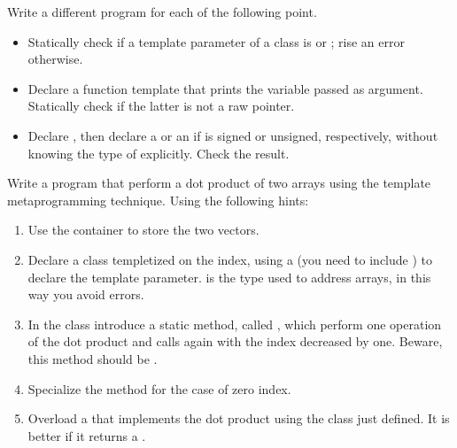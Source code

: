 Write a different program for each of the following point.
\begin{itemize}

    \item Statically check if a template parameter of a class is  or
    ; rise an error otherwise.

    \item Declare a function template that prints the variable passed as
    argument. Statically check if the latter is not a raw pointer.

    \item Declare , then declare a  or an
     if  is signed or unsigned, respectively, without knowing
    the type of  explicitly. Check the result.

\end{itemize}

Write a program that perform a dot product of two arrays using the template metaprogramming
technique. Using the following hints:

\begin{enumerate}

    \item Use the container  to store the two vectors.

    \item Declare a class templetized on the index, using a 
    (you need to include ) to declare the template parameter.
     is the type used to address arrays, in this way you avoid
    errors.

    \item In the class introduce a static method, called , which
    perform one operation of the dot product and calls again  with
    the index decreased by one. Beware, this method should be .

    \item Specialize the method  for the case of zero index.

    \item Overload a  that implements the dot product using the
    class just defined.  It is better if it returns a .

\end{enumerate}
